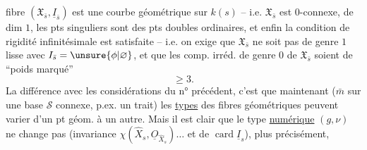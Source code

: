 fibre $(\mathfrak X_{\bar s},\underline I_{\bar s})$ est une courbe géométrique sur $k(s)$ -- i.e. $\mathfrak X_{\bar s}$ est $0$-connexe, de dim $1$,  les pts singuliers sont  des pts doubles ordinaires, et enfin la condition de rigidité infinitésimale  est satisfaite --  i.e. on exige que $\mathfrak X_{\bar s}$ ne soit pas de genre $1$ lisse avec $I_{\bar s}=\unsure{\phi|\varnothing}$, et que les comp. irréd. de genre $0$ de $\mathfrak X_{\bar s}$ soient de ``poids marqué''
\[
\geqslant 3.
\]
La différence avec les considérations du n° précédent, c'est que maintenant ($\bar m$ sur une base $\mathcal S$ connexe, p.ex.  un trait) les \uline{types} des fibres géométriques peuvent varier d'un pt géom. à un autre. Mais il est clair que le type \uline{numérique} $(g,\nu)$ ne change pas (invariance  $\chi(\widehat X_s,\underline O_{\widehat X_s})\ldots$ et de $\operatorname{card}\underline I_s$), plus précisément,

